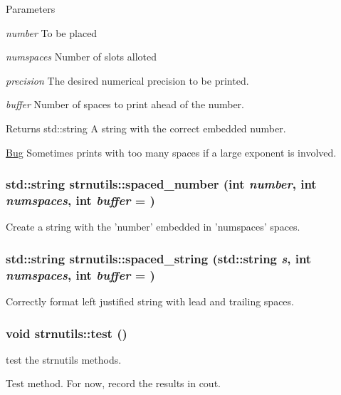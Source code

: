 \begin{DoxyParams}{Parameters}
\item[{\em number}]To be placed \item[{\em numspaces}]Number of slots alloted \item[{\em precision}]The desired numerical precision to be printed. \item[{\em buffer}]Number of spaces to print ahead of the number. \end{DoxyParams}
\begin{DoxyReturn}{Returns}
std::string A string with the correct embedded number.
\end{DoxyReturn}
\begin{Desc}
\item[\hyperlink{bug__bug000002}{Bug}]Sometimes prints with too many spaces if a large exponent is involved. \end{Desc}
\hypertarget{namespacestrnutils_a727f54c0678b84fb6ea3c7330779bdc9}{
\subsubsection[{spaced\_\-number}]{\setlength{\rightskip}{0pt plus 5cm}std::string strnutils::spaced\_\-number (int {\em number}, \/  int {\em numspaces}, \/  int {\em buffer} = {})}}
\label{namespacestrnutils_a727f54c0678b84fb6ea3c7330779bdc9}
Create a string with the 'number' embedded in 'numspaces' spaces. \hypertarget{namespacestrnutils_a0b72b12eb27c65df87f36eadc4b8c68c}{
\subsubsection[{spaced\_\-string}]{\setlength{\rightskip}{0pt plus 5cm}std::string strnutils::spaced\_\-string (std::string {\em s}, \/  int {\em numspaces}, \/  int {\em buffer} = {})}}
\label{namespacestrnutils_a0b72b12eb27c65df87f36eadc4b8c68c}
Correctly format left justified string with lead and trailing spaces. \hypertarget{namespacestrnutils_a1b83b9cdc56836d9e5981f61a9a985a9}{
\subsubsection[{test}]{\setlength{\rightskip}{0pt plus 5cm}void strnutils::test ()}}
\label{namespacestrnutils_a1b83b9cdc56836d9e5981f61a9a985a9}
test the strnutils methods.

Test method. For now, record the results in cout. 